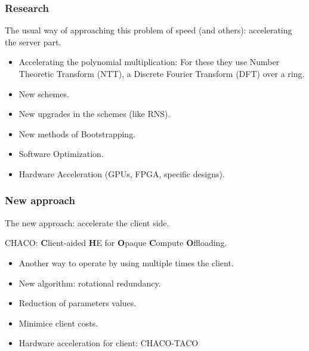 \documentclass[10pt,handout]{beamer}
\begin{document}
\begin{frame}
\frametitle{Research}

    The usual way of approaching this problem of speed (and others):  accelerating the server
    part.
\begin{itemize}
   \item Accelerating the polynomial multiplication:
    For these they use Number Theoretic Transform (NTT), a Discrete Fourier Transform (DFT) over a ring.
    \item New schemes.
    \item New upgrades in the schemes (like RNS).
   \item New methods of Bootstrapping.
   \item Software Optimization.
   \item Hardware Acceleration (GPUs, FPGA, specific designs).
\end{itemize}

\end{frame}


\begin{frame}
\frametitle{New approach}


    The new approach:  accelerate the client side.

    CHACO: \textbf{C}lient-aided \textbf{H}E for \textbf{O}paque \textbf{C}ompute \textbf{O}ffloading.


    \begin{itemize}
        \item Another way to operate by using multiple times the client.
        \item New algorithm: rotational redundancy.
        \item Reduction of parameters values.
        \item Minimice client costs.
        \item Hardware acceleration for client: CHACO-TACO
    \end{itemize}


\end{frame}


\begin{frame}
\frametitle{}


\end{frame}
\end{document}
